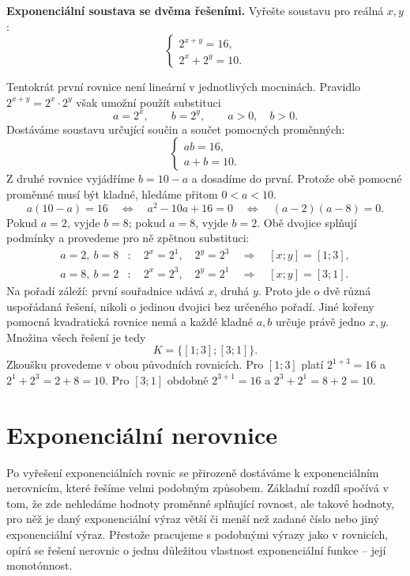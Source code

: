 \documentclass[12pt,a4paper]{article}
\begin{document}
\begin{examplebox}
\textbf{Exponenciální soustava se dvěma řešeními.}
Vyřešte soustavu pro reálná $x,y$:
\[
\begin{cases}
    2^{x+y}=16,\\
    2^x+2^y=10.
\end{cases}
\]

Tentokrát první rovnice není lineární v jednotlivých mocninách.
Pravidlo $2^{x+y}=2^x\cdot2^y$ však umožní použít substituci
\[
    a=2^x,\qquad b=2^y,\qquad a>0,\quad b>0.
\]
Dostáváme soustavu určující součin a součet pomocných proměnných:
\[
\begin{cases}
    ab=16,\\
    a+b=10.
\end{cases}
\]
Z druhé rovnice vyjádříme $b=10-a$ a dosadíme do první.
Protože obě pomocné proměnné musí být kladné, hledáme přitom $0<a<10$.
\[
    a(10-a)=16
    \quad\Longleftrightarrow\quad
    a^2-10a+16=0
    \quad\Longleftrightarrow\quad
    (a-2)(a-8)=0.
\]
Pokud $a=2$, vyjde $b=8$; pokud $a=8$, vyjde $b=2$.
Obě dvojice splňují podmínky a provedeme pro ně zpětnou substituci:
\[
\begin{aligned}
    a=2,\ b=8&:\quad 2^x=2^1,\quad 2^y=2^3
                    \quad\Longrightarrow\quad [x;y]=[1;3],\\
    a=8,\ b=2&:\quad 2^x=2^3,\quad 2^y=2^1
                    \quad\Longrightarrow\quad [x;y]=[3;1].
\end{aligned}
\]
Na pořadí záleží: první souřadnice udává $x$, druhá $y$.
Proto jde o dvě různá uspořádaná řešení, nikoli o jedinou dvojici bez určeného pořadí.
Jiné kořeny pomocná kvadratická rovnice nemá a každé kladné $a,b$ určuje právě jedno $x,y$.
Množina všech řešení je tedy
\[
    K=\{[1;3];[3;1]\}.
\]
Zkoušku provedeme v obou původních rovnicích.
Pro $[1;3]$ platí $2^{1+3}=16$ a $2^1+2^3=2+8=10$.
Pro $[3;1]$ obdobně $2^{3+1}=16$ a $2^3+2^1=8+2=10$.
\end{examplebox}

\section{Exponenciální nerovnice}

Po vyřešení exponenciálních rovnic se přirozeně dostáváme k exponenciálním nerovnicím,
které řešíme velmi podobným způsobem. Základní rozdíl spočívá v tom, že zde nehledáme hodnoty proměnné splňující rovnost, ale takové hodnoty, pro něž je daný exponenciální výraz větší či menší než
zadané číslo nebo jiný exponenciální výraz. Přestože pracujeme s podobnými výrazy jako v rovnicích,
opírá se řešení nerovnic o jednu důležitou vlastnost exponenciální funkce – její monotónnost.
\end{document}
